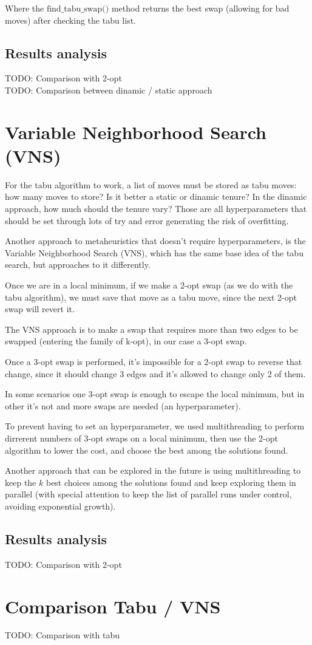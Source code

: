 Where the $\mbox{find\_tabu\_swap()}$ method returns the best swap (allowing for bad moves) after checking the tabu list.

\subsection{Results analysis}
TODO: Comparison with 2-opt\\

TODO: Comparison between dinamic / static approach
\section{Variable Neighborhood Search (VNS)}
For the tabu algorithm to work, a list of moves must be stored as tabu moves: how many moves to store? Is it better a static or dinamic tenure? In the dinamic approach, how much should the tenure vary? Those are all hyperparameters that should be set through lots of try and error generating the risk of overfitting.

Another approach to metaheuristics that doesn't require hyperparameters, is the Variable Neighborhood Search (VNS), which has the same base idea of the tabu search, but approaches to it differently.

Once we are in a local minimum, if we make a 2-opt swap (as we do with the tabu algorithm), we must save that move as a tabu move, since the next 2-opt swap will revert it.

The VNS approach is to make a swap that requires more than two edges to be swapped (entering the family of k-opt), in our case a 3-opt swap.

Once a 3-opt swap is performed, it's impossible for a 2-opt swap to reverse that change, since it should change 3 edges and it's allowed to change only 2 of them.

In some scenarios one 3-opt swap is enough to escape the local minimum, but in other it's not and more swaps are needed (an hyperparameter).

To prevent having to set an hyperparameter, we used multithreading to perform dirrerent numbers of 3-opt swaps on a local minimum, then use the 2-opt algorithm to lower the cost, and choose the best among the solutions found.

Another approach that can be explored in the future is using multithreading to keep the $k$ best choices among the solutions found and keep exploring them in parallel (with special attention to keep the list of parallel runs under control, avoiding exponential growth).
\subsection{Results analysis}
TODO: Comparison with 2-opt
\section{Comparison Tabu / VNS}
TODO: Comparison with tabu